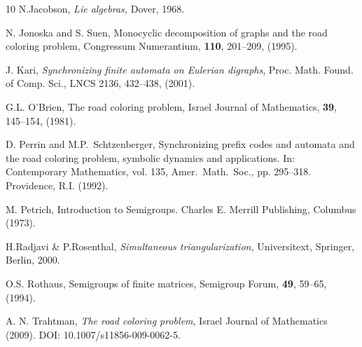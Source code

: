 \begin{thebibliography}{10}
 N.\tsp Jacobson, {\em Lie algebras,} Dover, 1968.

 N. Jonoska and S. Suen, 
Monocyclic decomposition of graphs and the road coloring problem, Congressum Numerantium, \textbf{110}, 201--209, (1995).

J. Kari,
\textit{Synchronizing finite automata on Eulerian digraphs},
Proc. Math. Found. of Comp. Sci., LNCS 2136, 432--438, (2001).

 G.L. O'Brien, 
The road coloring problem, 
Israel Journal of Mathematics, \textbf{39}, 145--154, (1981).

 D. Perrin and M.P.\ Schtzenberger, 
Synchronizing prefix codes and automata and the road coloring problem, symbolic dynamics and applications. 
In: Contemporary Mathematics, vol. 135, Amer.\ Math.\ Soc., pp. 295--318. Providence, R.I. (1992).

 M. Petrich, 
Introduction to Semigroups. 
Charles E. Merrill Publishing, Columbus (1973).

 H.\tsp Radjavi \& P.\tsp Rosenthal, 
{\em Simultaneous triangularization,} Universitext, Springer, Berlin, 2000.

 O.S. Rothaus, 
Semigroups of finite matrices, 
Semigroup Forum, \textbf{49}, 59--65, (1994).



% 
% 


 A. N. Trahtman,
\emph{The road coloring problem}, Israel Journal of Mathematics (2009).
DOI: 10.1007/s11856-009-0062-5.

\end{thebibliography}



